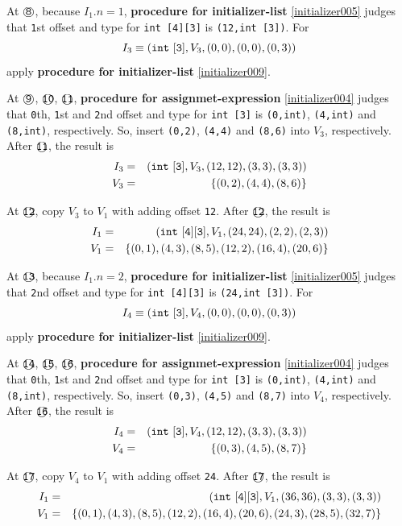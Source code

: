 \begin{Example}
\noindent
At $\MARU{\tt 8}$, because $I_1.n = 1$,
{\bf procedure for initializer-list}
\ref{initializer005} judges that
{\tt{1}}st offset and type for {\tt int [4][3]} is
{\tt (12,int [3])}. For
\[
I_3 \equiv ({\tt{int\,\,[3]}},V_3,(0,0),(0,0),(0,3))
\]
apply {\bf procedure for initializer-list} \ref{initializer009}.

\noindent
At $\MARU{\tt 9}$, $\MARU{\tt 10}$, $\MARU{\tt 11}$,
{\bf procedure for assignmet-expression}
\ref{initializer004} judges that
{\tt{0}}th, {\tt{1}}st and {\tt{2}}nd offset and type
for {\tt int [3]} is {\tt (0,int)}, {\tt (4,int)} and {\tt (8,int)},
respectively.
So, insert {\tt (0,2)}, {\tt (4,4)} and {\tt (8,6)} into $V_3$,
respectively.
After $\MARU{\tt 11}$,
the result is
\begin{eqnarray*}
I_3 & = & ({\tt{int\,\,[3]}},V_3,(12,12),(3,3),(3,3)) \\
V_3 & = & \{ (0,2),(4,4),(8,6) \}
\end{eqnarray*}

\noindent
At $\MARU{\tt 12}$,
copy $V_3$ to $V_1$ with adding offset {\tt 12}.
After $\MARU{\tt 12}$, the result is
\begin{eqnarray*}
I_1 & = & ({\tt{int\,\,[4][3]}},V_1,(24,24),(2,2),(2,3)) \\
V_1 & = & \{ (0,1),(4,3),(8,5),(12,2),(16,4),(20,6) \}
\end{eqnarray*}

\noindent
At $\MARU{\tt 13}$, because $I_1.n = 2$,
{\bf procedure for initializer-list}
\ref{initializer005} judges that
{\tt{2}}nd offset and type for {\tt int [4][3]} 
is {\tt (24,int [3])}. For
\[
I_4 \equiv ({\tt{int\,\,[3]}},V_4,(0,0),(0,0),(0,3))
\]
apply {\bf procedure for initializer-list} \ref{initializer009}.

\noindent
At $\MARU{\tt 14}$, $\MARU{\tt 15}$, $\MARU{\tt 16}$,
{\bf procedure for assignmet-expression}
\ref{initializer004} judges that
{\tt{0}}th, {\tt{1}}st and {\tt{2}}nd offset and type
for {\tt int [3]}
is {\tt (0,int)}, {\tt (4,int)} and {\tt (8,int)}, respectively.
So, insert {\tt (0,3)}, {\tt (4,5)} and {\tt (8,7)} into $V_4$,
respectively.
After $\MARU{\tt 16}$, the result is
\begin{eqnarray*}
I_4 & = & ({\tt{int\,\,[3]}},V_4,(12,12),(3,3),(3,3)) \\
V_4 & = & \{ (0,3),(4,5),(8,7) \}
\end{eqnarray*}

\noindent
At $\MARU{\tt 17}$, copy $V_4$ to $V_1$ with adding offset {\tt 24}.
After $\MARU{\tt 17}$, the result is
\begin{eqnarray*}
I_1 & = & ({\tt{int\,\,[4][3]}},V_1,(36,36),(3,3),(3,3)) \\
V_1 & = & \{ (0,1),(4,3),(8,5),(12,2),(16,4),(20,6),(24,3),(28,5),(32,7) \}
\end{eqnarray*}


\end{Example}
